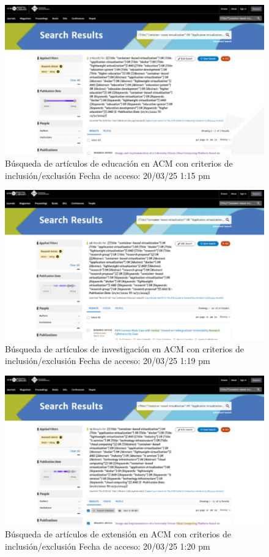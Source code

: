 \begin{figure}[htbp]
    \centering
    \includegraphics[width=\textwidth,keepaspectratio]{apendices/BD/criterios/ACM-ed.png}
    \caption{Búsqueda de artículos de educación en ACM con criterios de inclusión/exclusión
    Fecha de acceso: 20/03/25 1:15 pm
    }\label{fig:busqueda16}
\end{figure}
\FloatBarrier\begin{figure}[htbp]
    \centering
    \includegraphics[width=\textwidth,keepaspectratio]{apendices/BD/criterios/ACM-inv.png}
    \caption{Búsqueda de artículos de investigación en ACM con criterios de inclusión/exclusión
    Fecha de acceso: 20/03/25 1:19 pm
    }\label{fig:busqueda17}
\end{figure}
\FloatBarrier\begin{figure}[htbp]
    \centering
    \includegraphics[width=\textwidth,keepaspectratio]{apendices/BD/criterios/ACM-ind.png}
    \caption{Búsqueda de artículos de extensión en ACM con criterios de inclusión/exclusión
    Fecha de acceso: 20/03/25 1:20 pm
    }\label{fig:busqueda18}
\end{figure}
